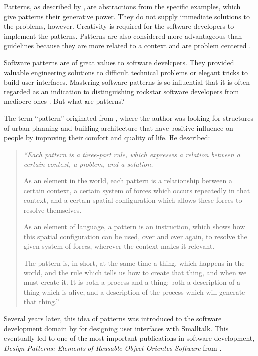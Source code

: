 \documentclass[a4paper,titlepage]{article}
\begin{document}
Patterns, as described by \citet{patterns:griffiths}, are abstractions
from the specific examples, which give patterns their generative
power. They do not supply immediate solutions to the problems,
however. Creativity is required for the software developers to
implement the patterns. Patterns are also considered more advantageous
than guidelines because they are more related to a context and are
problem centered \citep{patterns:welie}.

Software patterns are of great values to software developers. They
provided valuable engineering solutions to difficult technical
problems or elegant tricks to build user interfaces. Mastering
software patterns is so influential that it is often regarded as an
indication to distinguishing rockstar software developers from
mediocre ones \citep{rockstar:iskold}. But what are patterns?

The term ``pattern'' originated from \citet{timeless:alexander}, where
the author was looking for structures of urban planning and building
architecture that have positive influence on people by improving their
comfort and quality of life. He described:
\begin{quote}
  {\it ``Each pattern is a three-part rule, which expresses a relation
    between a certain context, a problem, and a solution.

    As an element in the world, each pattern is a relationship between
    a certain context, a certain system of forces which occurs
    repeatedly in that context, and a certain spatial configuration
    which allows these forces to resolve themselves.

    As an element of language, a pattern is an instruction, which
    shows how this spatial configuration can be used, over and over
    again, to resolve the given system of forces, wherever the context
    makes it relevant.

    The pattern is, in short, at the same time a thing, which happens
    in the world, and the rule which tells us how to create that
    thing, and when we must create it. It is both a process and a
    thing; both a description of a thing which is alive, and a
    description of the process which will generate that thing.''}

  \raggedleft \citep[p.~247]{timeless:alexander}
\end{quote}

Several years later, this idea of patterns was introduced to the
software development domain by \citet{patterns:beck} for designing
user interfaces with Smalltalk. This eventually led to one of the most
important publications in software development, \textit{Design
  Patterns: Elements of Reusable Object-Oriented Software} from
\citet{patterns:gamma}.
\end{document}
